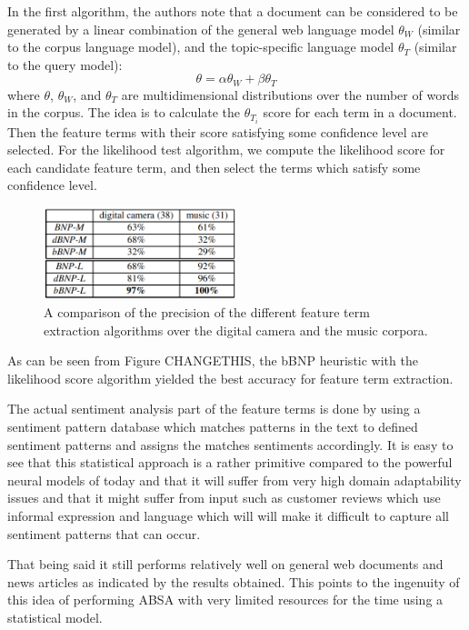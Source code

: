 \documentclass[conference]{IEEEtran}
\begin{document}
In the first algorithm, the authors note that a document can be considered to be generated by a linear combination of the general web language model $\theta_W$ (similar to the corpus language model), and the  topic-specific language model $\theta_T$ (similar to the query model):
\begin{equation*}
  \theta = \alpha \theta_W + \beta \theta_T
\end{equation*}
where $\theta$, $\theta_W$, and $\theta_T$ are multidimensional distributions over the number of words in the corpus. The idea is to calculate the $\theta_{T_i}$ score for each term in a document. Then the feature terms with their score satisfying some confidence level are selected. For the likelihood test algorithm, we compute the likelihood score for each candidate feature term, and then select the terms which satisfy some confidence level.

\begin{figure}[htbp]
\centerline{\includegraphics[keepaspectratio, width=0.5\textwidth]{pics/14.png}}
\caption{A comparison of the precision of the different feature term extraction algorithms over the digital camera and the music corpora.}
\label{fig}
\end{figure}

As can be seen from Figure CHANGETHIS, the bBNP heuristic with the likelihood score algorithm yielded the best accuracy for feature term extraction.

The actual sentiment analysis part of the feature terms is done by using a sentiment pattern database which matches patterns in the text to defined sentiment patterns and assigns the matches sentiments accordingly. It is easy to see that this statistical approach is a rather primitive compared to the powerful neural models of today and that it will suffer from very high domain adaptability issues and that it might suffer from input such as customer reviews which use informal expression and language which will will make it difficult to capture all sentiment patterns that can occur.

That being said it still performs relatively well on general web documents and news articles as indicated by the results obtained. This points to the ingenuity of this idea of performing ABSA with very limited resources for the time using a statistical model.
\end{document}
